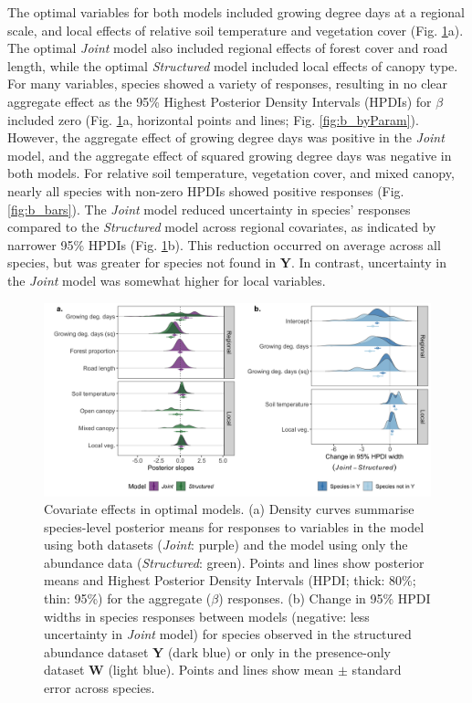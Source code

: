 \documentclass[preprint,review,times,12pt,3p]{elsarticle}
\begin{document}
The optimal variables for both models included growing degree days at a regional scale, and local effects of relative soil temperature and vegetation cover (Fig. \ref{fig:slope_means}a). The optimal \emph{Joint} model also included regional effects of forest cover and road length, while the optimal \emph{Structured} model included local effects of canopy type. For many variables, species showed a variety of responses, resulting in no clear aggregate effect as the 95\% Highest Posterior Density Intervals (HPDIs) for $\beta$ included zero (Fig. \ref{fig:slope_means}a, horizontal points and lines; Fig. \ref{fig:b_byParam}). However, the aggregate effect of growing degree days was positive in the \emph{Joint} model, and the aggregate effect of squared growing degree days was negative in both models. For relative soil temperature, vegetation cover, and mixed canopy, nearly all species with non-zero HPDIs showed positive responses (Fig. \ref{fig:b_bars}). The \emph{Joint} model reduced uncertainty in species' responses compared to the \emph{Structured} model across regional covariates, as indicated by narrower 95\% HPDIs (Fig. \ref{fig:slope_means}b). This reduction occurred on average across all species, but was greater for species not found in \textbf{Y}. In contrast, uncertainty in the \emph{Joint} model was somewhat higher for local variables.

\begin{figure}
\centering\includegraphics[width=6in]{../../../ms/1_Ecography/1/figs/slope_means+HDI.png}
\caption{\label{fig:slope_means} Covariate effects in optimal models. (a) Density curves summarise species-level posterior means for responses to variables in the model using both datasets (\emph{Joint}: purple) and the model using only the abundance data (\emph{Structured}: green). Points and lines show posterior means and Highest Posterior Density Intervals (HPDI; thick: 80\%; thin: 95\%) for the aggregate ($\beta$) responses. (b) Change in 95\% HPDI widths in species responses between models (negative: less uncertainty in \emph{Joint} model) for species observed in the structured abundance dataset \textbf{Y} (dark blue) or only in the presence-only dataset \textbf{W} (light blue). Points and lines show mean $\pm$ standard error across species. }
\end{figure}
\end{document}
